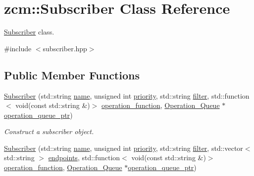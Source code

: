 \hypertarget{classzcm_1_1Subscriber}{}\section{zcm\+:\+:Subscriber Class Reference}
\label{classzcm_1_1Subscriber}


\hyperlink{classzcm_1_1Subscriber}{Subscriber} class.  




{\ttfamily \#include $<$subscriber.\+hpp$>$}

\subsection*{Public Member Functions}
\begin{DoxyCompactItemize}
\item 
\hyperlink{classzcm_1_1Subscriber_a054fca0d1323df3a9639b44cb3b3e183}{Subscriber} (std\+::string \hyperlink{classzcm_1_1Subscriber_a2ec3b22204d0f3f72e996b19b086910b}{name}, unsigned int \hyperlink{classzcm_1_1Subscriber_a208baedba808c9229887ab8af00725fd}{priority}, std\+::string \hyperlink{classzcm_1_1Subscriber_a28ab0921d97bc4d05ac6bb64c977cc35}{filter}, std\+::function$<$ void(const std\+::string \&)$>$ \hyperlink{classzcm_1_1Subscriber_aee61c147a26fd83f6e69e5fed48d8221}{operation\+\_\+function}, \hyperlink{classzcm_1_1Operation__Queue}{Operation\+\_\+\+Queue} $\ast$\hyperlink{classzcm_1_1Subscriber_a1cd579aa570832f9656b9fa24747dde3}{operation\+\_\+queue\+\_\+ptr})
\begin{DoxyCompactList}\small\item\em Construct a subscriber object. \end{DoxyCompactList}\item 
\hyperlink{classzcm_1_1Subscriber_a4573631cdf31199a937c87f9714daae3}{Subscriber} (std\+::string \hyperlink{classzcm_1_1Subscriber_a2ec3b22204d0f3f72e996b19b086910b}{name}, unsigned int \hyperlink{classzcm_1_1Subscriber_a208baedba808c9229887ab8af00725fd}{priority}, std\+::string \hyperlink{classzcm_1_1Subscriber_a28ab0921d97bc4d05ac6bb64c977cc35}{filter}, std\+::vector$<$ std\+::string $>$ \hyperlink{classzcm_1_1Subscriber_a81590d7017038d6f50073baaa485a1b7}{endpoints}, std\+::function$<$ void(const std\+::string \&)$>$ \hyperlink{classzcm_1_1Subscriber_aee61c147a26fd83f6e69e5fed48d8221}{operation\+\_\+function}, \hyperlink{classzcm_1_1Operation__Queue}{Operation\+\_\+\+Queue} $\ast$\hyperlink{classzcm_1_1Subscriber_a1cd579aa570832f9656b9fa24747dde3}{operation\+\_\+queue\+\_\+ptr})

\end{DoxyCompactItemize}
